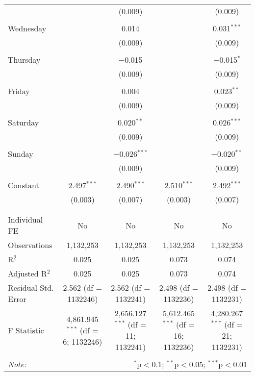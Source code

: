 \documentclass[
]{article}
\begin{document}
\begin{table}[!htbp]
{\begin{tabular}{@{\extracolsep{5pt}}lcccc}
  &  & (0.009) &  & (0.009) \\ 
  & & & & \\ 
 Wednesday &  & 0.014 &  & 0.031$^{***}$ \\ 
  &  & (0.009) &  & (0.009) \\ 
  & & & & \\ 
 Thursday &  & $-$0.015 &  & $-$0.015$^{*}$ \\ 
  &  & (0.009) &  & (0.009) \\ 
  & & & & \\ 
 Friday &  & 0.004 &  & 0.023$^{**}$ \\ 
  &  & (0.009) &  & (0.009) \\ 
  & & & & \\ 
 Saturday &  & 0.020$^{**}$ &  & 0.026$^{***}$ \\ 
  &  & (0.009) &  & (0.009) \\ 
  & & & & \\ 
 Sunday &  & $-$0.026$^{***}$ &  & $-$0.020$^{**}$ \\ 
  &  & (0.009) &  & (0.009) \\ 
  & & & & \\ 
 Constant & 2.497$^{***}$ & 2.490$^{***}$ & 2.510$^{***}$ & 2.492$^{***}$ \\ 
  & (0.003) & (0.007) & (0.003) & (0.007) \\ 
  & & & & \\ 
\hline \\[-1.8ex] 
Individual FE & No & No & No & No \\ 
Observations & 1,132,253 & 1,132,253 & 1,132,253 & 1,132,253 \\ 
R$^{2}$ & 0.025 & 0.025 & 0.073 & 0.074 \\ 
Adjusted R$^{2}$ & 0.025 & 0.025 & 0.073 & 0.074 \\ 
Residual Std. Error & 2.562 (df = 1132246) & 2.562 (df = 1132241) & 2.498 (df = 1132236) & 2.498 (df = 1132231) \\ 
F Statistic & 4,861.945$^{***}$ (df = 6; 1132246) & 2,656.127$^{***}$ (df = 11; 1132241) & 5,612.465$^{***}$ (df = 16; 1132236) & 4,280.267$^{***}$ (df = 21; 1132231) \\ 
\hline 
\hline \\[-1.8ex] 
\textit{Note:}  & \multicolumn{4}{r}{$^{*}$p$<$0.1; $^{**}$p$<$0.05; $^{***}$p$<$0.01} \\ 
\end{tabular}
} 
\end{table} 
\newpage
\end{document}
